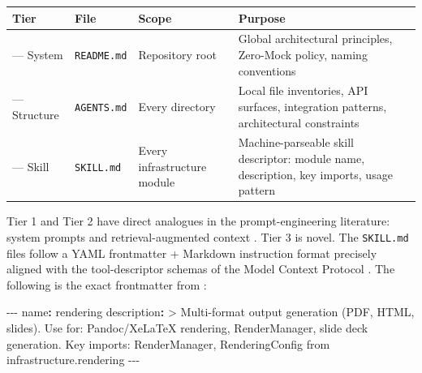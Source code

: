 \documentclass[
  english,
]{article}
\newenvironment{Shaded}{}{}
\newcommand{\AttributeTok}[1]{\textcolor[rgb]{0.49,0.56,0.16}{#1}}
\newcommand{\CharTok}[1]{\textcolor[rgb]{0.25,0.44,0.63}{#1}}
\newcommand{\FunctionTok}[1]{\textcolor[rgb]{0.02,0.16,0.49}{#1}}
\newcommand{\KeywordTok}[1]{\textcolor[rgb]{0.00,0.44,0.13}{\textbf{#1}}}
\newcommand{\NormalTok}[1]{#1}
\newcommand{\PreprocessorTok}[1]{\textcolor[rgb]{0.74,0.48,0.00}{#1}}
\newcounter{none} %
\begin{document}
{\def\LTcaptype{none} %
\begin{longtable}[]{@{}
  >{\raggedright\arraybackslash}p{}
  >{\raggedright\arraybackslash}p{}
  >{\raggedright\arraybackslash}p{}
  >{\raggedright\arraybackslash}p{}@{}}
\toprule\noalign{}
\begin{minipage}[b]{\linewidth}\raggedright
Tier
\end{minipage} & \begin{minipage}[b]{\linewidth}\raggedright
File
\end{minipage} & \begin{minipage}[b]{\linewidth}\raggedright
Scope
\end{minipage} & \begin{minipage}[b]{\linewidth}\raggedright
Purpose
\end{minipage} \\
\midrule\noalign{}
\endhead
\bottomrule\noalign{}
\endlastfoot
1 --- System & \texttt{README.md} & Repository root & Global
architectural principles, Zero-Mock policy, naming conventions \\
2 --- Structure & \texttt{AGENTS.md} & Every directory & Local file
inventories, API surfaces, integration patterns, architectural
constraints \\
3 --- Skill & \texttt{SKILL.md} & Every infrastructure module &
Machine-parseable skill descriptor: module name, description, key
imports, usage pattern \\
\end{longtable}
}

Tier 1 and Tier 2 have direct analogues in the prompt-engineering
literature: system prompts and retrieval-augmented context
\citep{lau2025aicoding}. Tier 3 is novel. The \texttt{SKILL.md} files
follow a YAML frontmatter + Markdown instruction format precisely
aligned with the tool-descriptor schemas of the Model Context Protocol
\citep{anthropic2024mcp}. The following is the exact frontmatter from
:

\begin{Shaded}
\begin{Highlighting}[]
\PreprocessorTok{{-}{-}{-}}
\FunctionTok{name}\KeywordTok{:}\AttributeTok{ rendering}
\FunctionTok{description}\KeywordTok{: }\CharTok{\textgreater{}}
\NormalTok{  Multi{-}format output generation (PDF, HTML, slides).}
\NormalTok{  Use for: Pandoc/XeLaTeX rendering, RenderManager, slide deck generation.}
\NormalTok{  Key imports: RenderManager, RenderingConfig from infrastructure.rendering}
\PreprocessorTok{{-}{-}{-}}
\end{Highlighting}
\end{Shaded}
\end{document}
